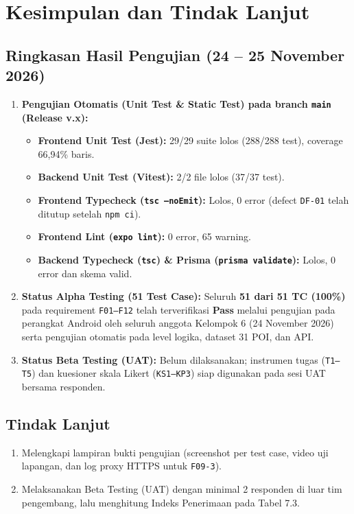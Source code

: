 \chapter{Kesimpulan dan Tindak Lanjut}
\label{bab:kesimpulan-dan-tindak-lanjut}

\section{Ringkasan Hasil Pengujian (24 -- 25 November 2026)}

\begin{enumerate}
  \item \textbf{Pengujian Otomatis (Unit Test \& Static Test) pada branch \texttt{main} (Release v.x):}
  \begin{itemize}
    \item \textbf{Frontend Unit Test (Jest):} 29/29 suite lolos (288/288 test), coverage 66,94\% baris.
    \item \textbf{Backend Unit Test (Vitest):} 2/2 file lolos (37/37 test).
    \item \textbf{Frontend Typecheck (\texttt{tsc --noEmit}):} Lolos, 0 error (defect \texttt{DF-01} telah ditutup setelah \texttt{npm ci}).
    \item \textbf{Frontend Lint (\texttt{expo lint}):} 0 error, 65 warning.
    \item \textbf{Backend Typecheck (\texttt{tsc}) \& Prisma (\texttt{prisma validate}):} Lolos, 0 error dan skema valid.
  \end{itemize}
  \item \textbf{Status Alpha Testing (51 Test Case):} Seluruh \textbf{51 dari 51 TC (100\%)} pada requirement \texttt{F01--F12} telah terverifikasi \textbf{Pass} melalui pengujian pada perangkat Android oleh seluruh anggota Kelompok 6 (24 November 2026) serta pengujian otomatis pada level logika, dataset 31 POI, dan API.
  \item \textbf{Status Beta Testing (UAT):} Belum dilaksanakan; instrumen tugas (\texttt{T1--T5}) dan kuesioner skala Likert (\texttt{KS1--KP3}) siap digunakan pada sesi UAT bersama responden.
\end{enumerate}

\section{Tindak Lanjut}

\begin{enumerate}
  \item Melengkapi lampiran bukti pengujian (screenshot per test case, video uji lapangan, dan log proxy HTTPS untuk \texttt{F09-3}).
  \item Melaksanakan Beta Testing (UAT) dengan minimal 2 responden di luar tim pengembang, lalu menghitung Indeks Penerimaan pada Tabel 7.3.
\end{enumerate}
